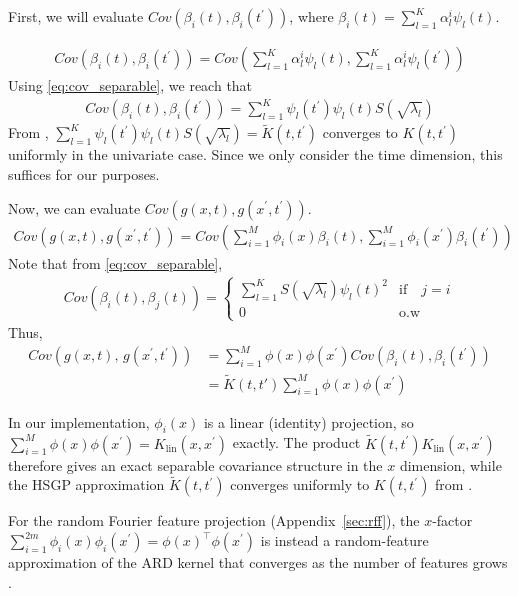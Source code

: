 First, we will evaluate $Cov(\beta_i(t), \beta_i(t^{'}))$,
where $\beta_i(t) = \sum_{l=1}^K \alpha_l^i \psi_l(t)$.

\begin{align}
    Cov(\beta_i(t), \beta_i(t^{'})) = Cov(\sum_{l=1}^K \alpha_l^i \psi_l(t), \sum_{l=1}^K \alpha_l^i \psi_l(t^{'})) 
\end{align}
Using \eqref{eq:cov_separable}, we reach that 
\begin{align}
    Cov(\beta_i(t), \beta_i(t^{'})) = \sum_{l=1}^K  \psi_l(t^{'}) \psi_l(t) S(\sqrt{\lambda_l})
\end{align}
From \cite{Solin_2019}, $\sum_{l=1}^K  \psi_l(t^{'}) \psi_l(t) S(\sqrt{\lambda_l}) = \tilde{K}(t,t^{'})$ converges to $ K(t, t^{'})$ uniformly in the univariate case. Since we only consider the time dimension, this suffices for our purposes. 

Now, we can evaluate $Cov( g(x,t) , g(x^{'},t^{'} ))$.
\begin{align}
    Cov( g(x,t) , g(x^{'},t^{'} )) = Cov(\sum_{i=1}^M \phi_i(x)  \beta_i(t) , \sum_{i=1}^M \phi_i(x^{'})  \beta_i(t^{'}) )
\end{align}
Note that from \eqref{eq:cov_separable},
\begin{align}
\label{eq:cov_separable_2}
Cov(\beta_i(t), \beta_j(t)) = 
\begin{cases}
\sum_{l=1}^K S(\sqrt{\lambda_l}) \psi_l(t)^2& \text{if} \quad j = i \\
0 & \text{o.w}
\end{cases}
\end{align}
Thus,
\begin{align}
    Cov\!\left( g(x,t),\, g(x^{'},t^{'}) \right)
    &= \sum_{i=1}^M \phi(x)\phi(x^{'}) Cov\!\left(\beta_i(t), \beta_i(t^{'})\right) \nonumber\\
    &= \tilde{K}(t,t') \sum_{i=1}^M \phi(x)\phi(x^{'})
\end{align}
{\sloppy In our implementation, $\phi_i(x)$ is a linear (identity) projection, so $\sum_{i=1}^M \phi(x)\phi(x^{'}) = K_{\mathrm{lin}}(x,x^{'})$ exactly. The product $\tilde{K}(t,t^{'}) K_{\mathrm{lin}}(x,x^{'})$ therefore gives an exact separable covariance structure in the $x$ dimension, while the HSGP approximation $\tilde{K}(t,t^{'})$ converges uniformly to $K(t,t^{'})$ from \cite{Solin_2019}.\par}

{\sloppy For the random Fourier feature projection (Appendix~\ref{sec:rff}), the $x$-factor $\sum_{i=1}^{2m}\phi_i(x)\phi_i(x^{'}) = \phi(x)^\top\phi(x^{'})$ is instead a random-feature approximation of the ARD kernel that converges as the number of features grows \cite{rffs}.\par}

